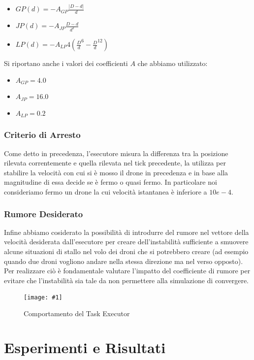 \documentclass[a4paper,11pt,oneside, table]{article}
\newcommand{\putimage}[4] {
	\begin{figure}[H]
	    \centering
	    \texttt{[image: \#1]}
	    \caption{#2}\label{#3}
	\end{figure}
}
\begin{document}
\begin{itemize}
  \item $GP(d) = -A_{GP} \frac {|D - d|} {d}$
  \item $JP(d) = -A_{JP} \frac {D - d} {d^2}$
  \item $LP(d) = -A_{LP} 4 ({\frac {D} {d}}^6 - {\frac {D} {d}}^{12})$
\end{itemize}

Si riportano anche i valori dei coefficienti $A$ che abbiamo utilizzato:

\begin{itemize}
  \item $A_{GP} = 4.0$
  \item $A_{JP} = 16.0$
  \item $A_{LP} = 0.2$
\end{itemize}

\subsubsection{Criterio di Arresto}
Come detto in precedenza, l'esecutore misura la differenza tra la posizione rilevata correntemente e quella rilevata nel tick precedente, la utilizza per stabilire la velocit\`a con cui si \`e mosso il drone in precedenza e in base alla magnitudine di essa decide se \`e fermo o quasi fermo.
In particolare noi consideriamo fermo un drone la cui velocit\`a istantanea \`e inferiore a $10e-4$.

\subsubsection{Rumore Desiderato}
Infine abbiamo cosiderato la possibilit\`a di introdurre del rumore nel vettore della velocit\`a desiderata dall'esecutore per creare dell'instabilit\`a sufficiente a smuovere alcune situazioni di stallo nel volo dei droni che si potrebbero creare (ad esempio quando due droni vogliono andare nella stessa direzione ma nel verso opposto).
Per realizzare ci\`o \`e fondamentale valutare l'impatto del coefficiente di rumore per evitare che l'instabilit\`a sia tale da non permettere alla simulazione di convergere.

\putimage{images/task-executor.png}{Comportamento del Task Executor}{png:task-executor}{0.99}

\section{Esperimenti e Risultati}
\end{document}
